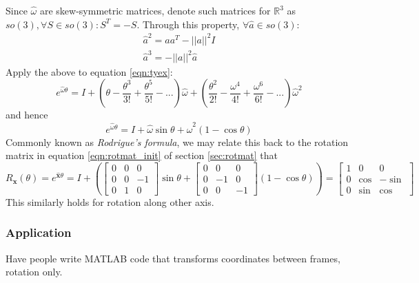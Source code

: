 \documentclass[letterpaper]{article}
\begin{document}
Since $\widehat{\omega}$ are skew-symmetric matrices, denote such matrices for $\mathbb{R}^3$ as $so(3), \forall S \in so(3): S^{T} = -S$. 
Through this property, $\forall \widehat{a} \in so(3)$:
\begin{equation*}
  \begin{split}
    \widehat{a}^2 = aa^T - ||a||^2I\\
    \widehat{a}^3 = -||a||^2\widehat{a}
  \end{split}
\end{equation*}
Apply the above to equation \ref{eqn:tyex}:
\begin{equation*}
  e^{\widehat{\omega}\theta} = I + \left(\theta - \frac{\theta^3}{3!} + \frac{\theta^5}{5!} - ...\right)\widehat{\omega} +
    \left(\frac{\theta^2}{2!} - \frac{\omega^4}{4!} + \frac{\omega^6}{6!} - ... \right)\widehat{\omega}^2
\end{equation*}
and hence
\begin{equation}
  \boxed{e^{\widehat{\omega}\theta} = I + \widehat{\omega}\sin\theta + \widehat{\omega}^2\left(1 - \cos\theta\right)}
\end{equation}
Commonly known as \emph{Rodrigue's formula}, we may relate this back to the rotation matrix in equation \ref{eqn:rotmat_init} of section \ref{sec:rotmat} that
\begin{equation}
  R_{\mathbf{x}}(\theta) = e^{\widehat{\mathbf{x}}\theta} = I + \left(
    \begin{bmatrix}
    0&0&0\\0&0&-1\\0&1&0
  \end{bmatrix} \sin\theta +
  \begin{bmatrix}
    0&0&0\\0&-1&0\\0&0&-1
  \end{bmatrix} (1-\cos\theta)
  \right) = \begin{bmatrix}
    1 & 0 & 0\\
    0 &\cos & -\sin\\
    0 &\sin & \cos
  \end{bmatrix}
\end{equation}
This similarly holds for rotation along other axis.

\subsubsection{Application}
Have people write MATLAB code that transforms coordinates between frames, rotation only. 
\end{document}
